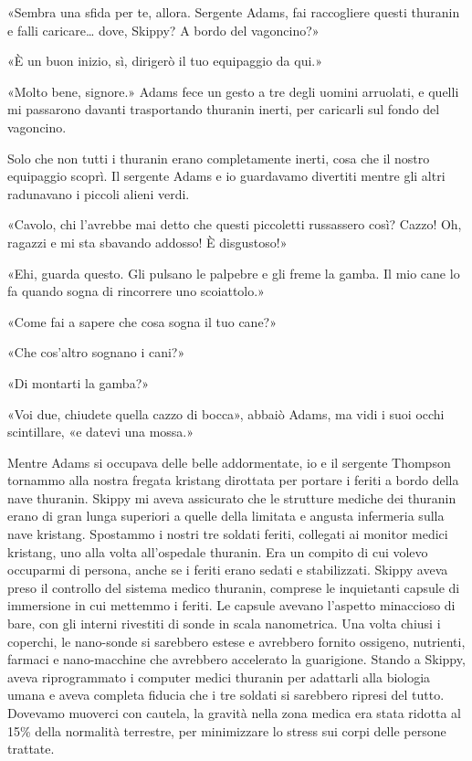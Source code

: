 «Sembra una sfida per te, allora. Sergente Adams, fai raccogliere questi
thuranin e falli caricare\ldots{} dove, Skippy? A bordo del vagoncino?»

«È un buon inizio, sì, dirigerò il tuo equipaggio da qui.»

«Molto bene, signore.» Adams fece un gesto a tre degli uomini arruolati,
e quelli mi passarono davanti trasportando thuranin inerti, per
caricarli sul fondo del vagoncino.

Solo che non tutti i thuranin erano completamente inerti, cosa che il
nostro equipaggio scoprì. Il sergente Adams e io guardavamo divertiti
mentre gli altri radunavano i piccoli alieni verdi.

«Cavolo, chi l'avrebbe mai detto che questi piccoletti russassero così?
Cazzo! Oh, ragazzi e mi sta sbavando addosso! È disgustoso!»

«Ehi, guarda questo. Gli pulsano le palpebre e gli freme la gamba. Il
mio cane lo fa quando sogna di rincorrere uno scoiattolo.»

«Come fai a sapere che cosa sogna il tuo cane?»

«Che cos'altro sognano i cani?»

«Di montarti la gamba?»

«Voi due, chiudete quella cazzo di bocca», abbaiò Adams, ma vidi i suoi
occhi scintillare, «e datevi una mossa.»

\hfill\break

Mentre Adams si occupava delle belle addormentate, io e il sergente
Thompson tornammo alla nostra fregata kristang dirottata per portare i
feriti a bordo della nave thuranin. Skippy mi aveva assicurato che le
strutture mediche dei thuranin erano di gran lunga superiori a quelle
della limitata e angusta infermeria sulla nave kristang. Spostammo i
nostri tre soldati feriti, collegati ai monitor medici kristang, uno
alla volta all'ospedale thuranin. Era un compito di cui volevo occuparmi
di persona, anche se i feriti erano sedati e stabilizzati. Skippy aveva
preso il controllo del sistema medico thuranin, comprese le inquietanti
capsule di immersione in cui mettemmo i feriti. Le capsule avevano
l'aspetto minaccioso di bare, con gli interni rivestiti di sonde in
scala nanometrica. Una volta chiusi i coperchi, le nano-sonde si
sarebbero estese e avrebbero fornito ossigeno, nutrienti, farmaci e
nano-macchine che avrebbero accelerato la guarigione. Stando a Skippy,
aveva riprogrammato i computer medici thuranin per adattarli alla
biologia umana e aveva completa fiducia che i tre soldati si sarebbero
ripresi del tutto. Dovevamo muoverci con cautela, la gravità nella zona
medica era stata ridotta al 15\% della normalità terrestre, per
minimizzare lo stress sui corpi delle persone trattate.

